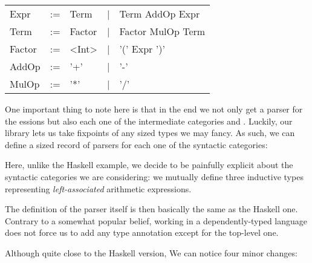\noindent
\begin{minipage}{0.45\textwidth}
\end{minipage}
\begin{minipage}{0.55\textwidth}
  \begin{tabular}{lllll}
    Expr   & := & Term   & | & Term AddOp Expr \\
    Term   & := & Factor & | & Factor MulOp Term \\
    Factor & := & <Int>  & | & '(' Expr ')' \\
    AddOp  & := & '+' & | & '-' \\
    MulOp  & := & '*' & | & '/' \\
  \end{tabular}
\end{minipage}

One important thing to note here is that in the end we not only get a
parser for the essions but also each one of the intermediate
categories  and . Luckily, our library lets us
take fixpoints of any sized types we may fancy. As such, we can define
a sized record of parsers for each one of the syntactic categories:


Here, unlike the Haskell example, we decide to be painfully explicit
about the syntactic categories we are considering: we mutually define
three inductive types representing \emph{left-associated} arithmetic
expressions.

\begin{minipage}{0.33\textwidth}
\end{minipage}
\begin{minipage}{0.35\textwidth}
\end{minipage}
\begin{minipage}{0.20\textwidth}
\end{minipage}

The definition of the parser itself is then basically the same as the
Haskell one. Contrary to a somewhat popular belief, working in a
dependently-typed language does not force us to add any type annotation
except for the top-level one.


Although quite close to the Haskell version, We can notice four minor changes:

